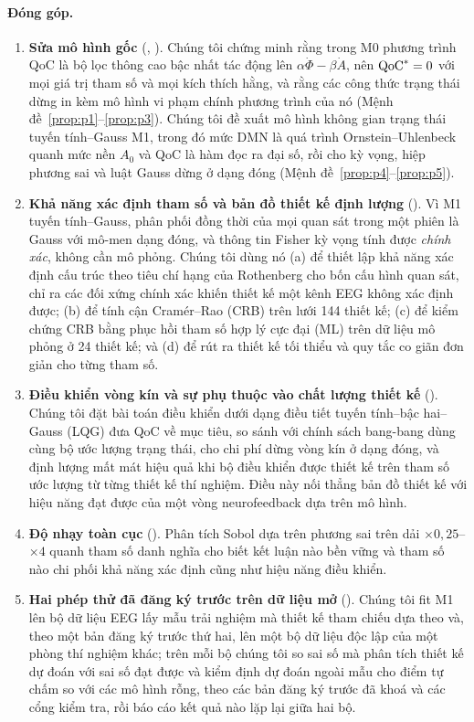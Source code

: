 \paragraph{Đóng góp.}
\begin{enumerate}
  \item \textbf{Sửa mô hình gốc} (, ). Chúng tôi chứng minh rằng trong M0 phương trình QoC là bộ lọc thông cao bậc nhất tác động lên $\alpha\dot\Phi-\beta\dot A$, nên $\mathrm{QoC}^*=0$ với mọi giá trị tham số và mọi kích thích hằng, và rằng các công thức trạng thái dừng in kèm mô hình vi phạm chính phương trình của nó (Mệnh đề~\ref{prop:p1}--\ref{prop:p3}). Chúng tôi đề xuất mô hình không gian trạng thái tuyến tính--Gauss M1, trong đó mức DMN là quá trình Ornstein--Uhlenbeck quanh mức nền $A_0$ và QoC là hàm đọc ra đại số, rồi cho kỳ vọng, hiệp phương sai và luật Gauss dừng ở dạng đóng (Mệnh đề~\ref{prop:p4}--\ref{prop:p5}).
  \item \textbf{Khả năng xác định tham số và bản đồ thiết kế định lượng} (). Vì M1 tuyến tính--Gauss, phân phối đồng thời của mọi quan sát trong một phiên là Gauss với mô-men dạng đóng, và thông tin Fisher kỳ vọng tính được \emph{chính xác}, không cần mô phỏng. Chúng tôi dùng nó (a) để thiết lập khả năng xác định cấu trúc theo tiêu chí hạng của Rothenberg cho bốn cấu hình quan sát, chỉ ra các đối xứng chính xác khiến thiết kế một kênh EEG không xác định được; (b) để tính cận Cramér--Rao (CRB) trên lưới 144 thiết kế; (c) để kiểm chứng CRB bằng phục hồi tham số hợp lý cực đại (ML) trên dữ liệu mô phỏng ở 24 thiết kế; và (d) để rút ra thiết kế tối thiểu và quy tắc co giãn đơn giản cho từng tham số.
  \item \textbf{Điều khiển vòng kín và sự phụ thuộc vào chất lượng thiết kế} (). Chúng tôi đặt bài toán điều khiển dưới dạng điều tiết tuyến tính--bậc hai--Gauss (LQG) đưa QoC về mục tiêu, so sánh với chính sách bang-bang dùng cùng bộ ước lượng trạng thái, cho chi phí dừng vòng kín ở dạng đóng, và định lượng mất mát hiệu quả khi bộ điều khiển được thiết kế trên tham số ước lượng từ từng thiết kế thí nghiệm. Điều này nối thẳng bản đồ thiết kế với hiệu năng đạt được của một vòng neurofeedback dựa trên mô hình.
  \item \textbf{Độ nhạy toàn cục} (). Phân tích Sobol dựa trên phương sai trên dải $\times 0{,}25$--$\times 4$ quanh tham số danh nghĩa cho biết kết luận nào bền vững và tham số nào chi phối khả năng xác định cũng như hiệu năng điều khiển.
  \item \textbf{Hai phép thử đã đăng ký trước trên dữ liệu mở} (). Chúng tôi fit M1 lên bộ dữ liệu EEG lấy mẫu trải nghiệm mà thiết kế tham chiếu dựa theo và, theo một bản đăng ký trước thứ hai, lên một bộ dữ liệu độc lập của một phòng thí nghiệm khác; trên mỗi bộ chúng tôi so sai số mà phân tích thiết kế dự đoán với sai số đạt được và kiểm định dự đoán ngoài mẫu cho điểm tự chấm so với các mô hình rỗng, theo các bản đăng ký trước đã khoá và các cổng kiểm tra, rồi báo cáo kết quả nào lặp lại giữa hai bộ.
\end{enumerate}

